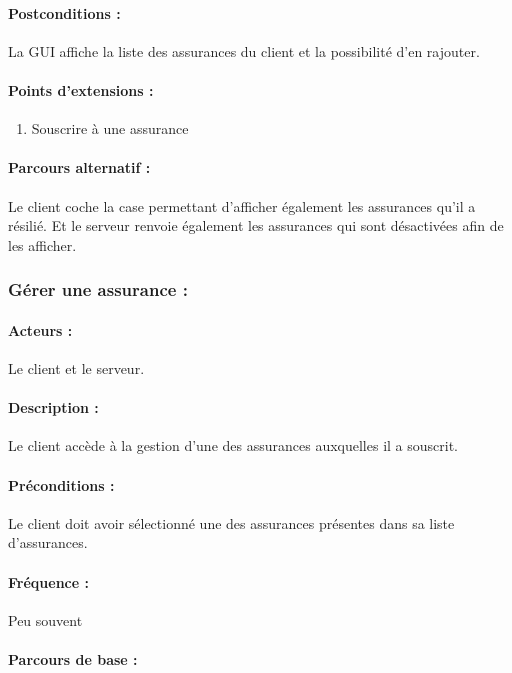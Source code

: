 \documentclass[../annexe.tex]{subfiles}
\begin{document}
\paragraph{Postconditions :} La GUI affiche la liste des assurances du client et la possibilité d'en rajouter.

\paragraph{Points d'extensions :} 
\begin{enumerate}
	\item Souscrire à une assurance
\end{enumerate}

\paragraph{Parcours alternatif :}
		Le client coche la case permettant d'afficher également les assurances qu'il a résilié. Et le serveur renvoie également les assurances qui sont désactivées 
		afin de les afficher.
\newpage

\subsubsection{Gérer une assurance :}

\paragraph{Acteurs :} Le client et le serveur.

\paragraph{Description :} Le client accède à la gestion d'une des assurances auxquelles il a souscrit. 

\paragraph{Préconditions :} Le client doit avoir sélectionné une des assurances présentes dans sa liste d'assurances.

\paragraph{Fréquence :} Peu souvent

\paragraph{Parcours de base :}
\end{document}
